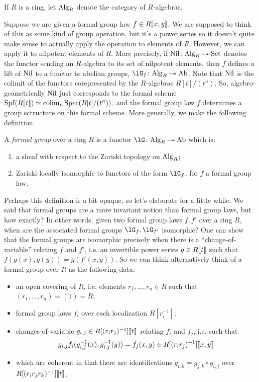 \begin{notation}
  \label{chrom-algr}
  If $R$ is a ring, let $\mathrm{Alg}_R$ denote the category of $R$-algebras.
\end{notation}

Suppose we are given a formal group law $f \in R \llbracket x,y \rrbracket$. We
are supposed to think of this as some kind of group operation, but
it's a power series so it doesn't quite make sense to actually apply
the operation to elements of $R$. However, we can apply it to
nilpotent elements of $R$. More precisely, if
$\Nil \c \Alg_R \to \Set$ denotes the functor sending an $R$-algebra
to its set of nilpotent elements, then $f$ defines a lift of $\operatorname{Nil}$ to
a functor to abelian groups, $\lG_f \c \Alg_R \to \Ab$. Note that
$\operatorname{Nil}$ is the colimit of the functors corepresented by the
$R$-algebras $R[t]/(t^n)$. So, algebro-geometrically $\operatorname{Nil}$ just
corresponds to the formal scheme
$\operatorname{Spf}(R\llbracket t \rrbracket) \simeq \operatorname*{colim}_n \operatorname{Spec}(R[t]/(t^n))$, and the formal
group law $f$ determines a group sctructure on this formal
scheme. More generally, we make the following definition.

\begin{definition}
  \label{chrom-fg}
  A \emph{formal group} over a ring $R$ is a functor
  $\lG \c \Alg_R \to \Ab$ which is:
  \begin{enumerate}
  \item a sheaf with respect to the Zariski topology on $\mathrm{Alg}_R$;
  \item Zariski-locally isomorphic to functors of the form $\lG_f$,
    for $f$ a formal group law.
  \end{enumerate}
\end{definition}

Perhaps this definition is a bit opaque, so let's elaborate for a
little while. We said that formal groups are a more invariant notion
than formal group laws, but how exactly? In other words, given two
formal group laws $f,f'$ over a ring $R$, when are the associated
formal groups $\lG_f, \lG_{f'}$ isomorphic? One can show that the
formal groups are isomorphic precisely when there is a
``change-of-variable'' relating $f$ and $f'$, i.e. an invertible power
series $g \in R \llbracket t \rrbracket$ such that $f(g(x),g(y)) = g(f'(x,y))$. So
we can think alternatively think of a formal group over $R$ as the
following data:
\begin{itemize}
\item an open covering of $R$, i.e. elements $r_1,\ldots,r_n \in R$
  such that $(r_1,\ldots,r_n) = (1) = R$;
\item formal group laws $f_i$ over each localization $R[r_i^{-1}]$;
\item changes-of-variable $g_{i,j} \in R[(r_ir_j)^{-1}] \llbracket t \rrbracket$
  relating $f_i$ and $f_j$, i.e. such that
  \[
  g_{i,j}f_i(g_{i,j}^{-1}(x),g_{i,j}^{-1}(y)) = f_j(x,y) \in
  R[(r_ir_j)^{-1}] \llbracket x,y \rrbracket
  \]
\item which are coherent in that there are identifications
  $g_{i,k} = g_{j,k} \circ g_{i,j}$ over
  $R[(r_ir_jr_k)^{-1}] \llbracket t \rrbracket$.
\end{itemize}

